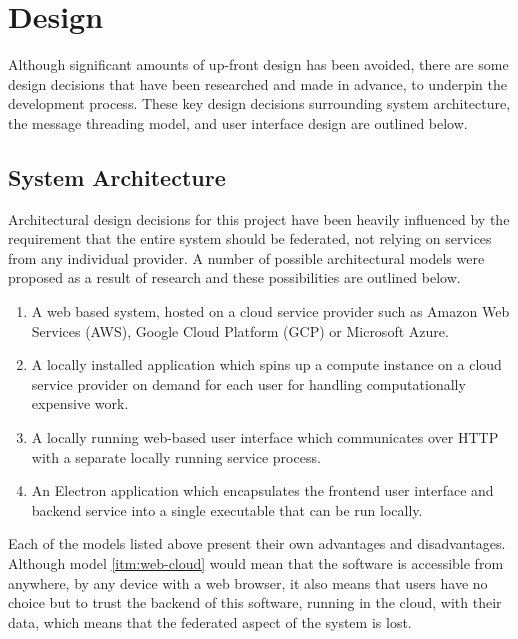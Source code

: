 \chapter{Design}

Although significant amounts of up-front design has been avoided, there are some design decisions that have been researched and made in advance, to underpin the development process. These key design decisions surrounding system architecture, the message threading model, and user interface design are outlined below.

\section{System Architecture}\label{sec:high-level-architecture}

Architectural design decisions for this project have been heavily influenced by the requirement that the entire system should be federated, not relying on services from any individual provider. A number of possible architectural models were proposed as a result of research and these possibilities are outlined below.

\begin{enumerate}
  \item \label{itm:web-cloud} A web based system, hosted on a cloud service provider such as Amazon Web Services (AWS), Google Cloud Platform (GCP) or Microsoft Azure.
  \item \label{itm:on-demand-cloud} A locally installed application which spins up a compute instance on a cloud service provider on demand for each user for handling computationally expensive work.
  \item \label{itm:local-service} A locally running web-based user interface which communicates over HTTP with a separate locally running service process.
  \item \label{itm:electron} An Electron application which encapsulates the frontend user interface and backend service into a single executable that can be run locally.
\end{enumerate}

Each of the models listed above present their own advantages and disadvantages. Although model \ref{itm:web-cloud} would mean that the software is accessible from anywhere, by any device with a web browser, it also means that users have no choice but to trust the backend of this software, running in the cloud, with their data, which means that the federated aspect of the system is lost.

